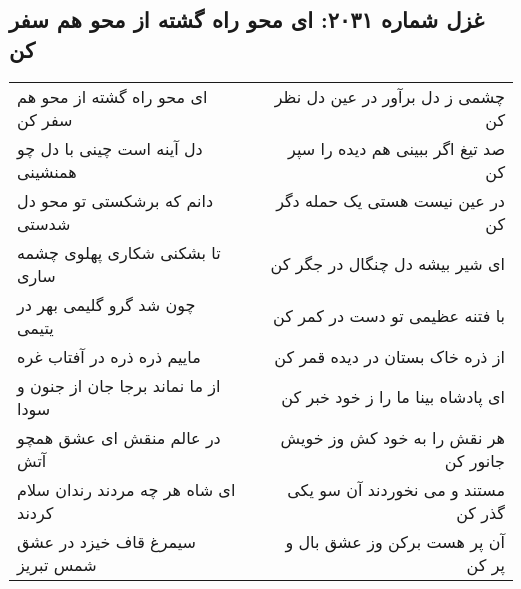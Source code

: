 \begin{center}
\section*{غزل شماره ۲۰۳۱: ای محو راه گشته از محو هم سفر کن}
\label{sec:2031}
\begin{longtable}{l p{0.5cm} r}
ای محو راه گشته از محو هم سفر کن
&&
چشمی ز دل برآور در عین دل نظر کن
\\
دل آینه است چینی با دل چو همنشینی
&&
صد تیغ اگر ببینی هم دیده را سپر کن
\\
دانم که برشکستی تو محو دل شدستی
&&
در عین نیست هستی یک حمله دگر کن
\\
تا بشکنی شکاری پهلوی چشمه ساری
&&
ای شیر بیشه دل چنگال در جگر کن
\\
چون شد گرو گلیمی بهر در یتیمی
&&
با فتنه عظیمی تو دست در کمر کن
\\
ماییم ذره ذره در آفتاب غره
&&
از ذره خاک بستان در دیده قمر کن
\\
از ما نماند برجا جان از جنون و سودا
&&
ای پادشاه بینا ما را ز خود خبر کن
\\
در عالم منقش ای عشق همچو آتش
&&
هر نقش را به خود کش وز خویش جانور کن
\\
ای شاه هر چه مردند رندان سلام کردند
&&
مستند و می نخوردند آن سو یکی گذر کن
\\
سیمرغ قاف خیزد در عشق شمس تبریز
&&
آن پر هست برکن وز عشق بال و پر کن
\\
\end{longtable}
\end{center}
